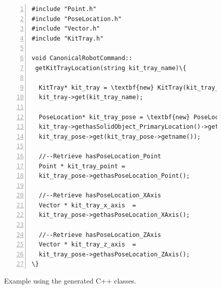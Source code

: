 \begin{figure}[t!h!]
\begin{minipage}{.5\paperwidth}
\begin{mylisting}
\begin{Verbatim}[commandchars=\\\{\},fontsize=\scriptsize, numbers=left, numbersep=2pt]
#include "Point.h"
#include "PoseLocation.h"
#include "Vector.h"
#include "KitTray.h"

void CanonicalRobotCommand::
 getKitTrayLocation(string kit_tray_name)\{

  KitTray* kit_tray = \textbf{new} KitTray(kit_tray_name);
  kit_tray->get(kit_tray_name);

  PoseLocation* kit_tray_pose = \textbf{new} PoseLocation(
  kit_tray->gethasSolidObject_PrimaryLocation()->getname());
  kit_tray_pose->get(kit_tray_pose->getname());

  //--Retrieve hasPoseLocation_Point
  Point * kit_tray_point =
  kit_tray_pose->gethasPoseLocation_Point();

  //--Retrieve hasPoseLocation_XAxis
  Vector * kit_tray_x_axis  =
  kit_tray_pose->gethasPoseLocation_XAxis();

  //--Retrieve hasPoseLocation_ZAxis
  Vector * kit_tray_z_axis  =
  kit_tray_pose->gethasPoseLocation_ZAxis();
\}
\end{Verbatim}
\end{mylisting}
\end{minipage}
\caption{Example using the generated C++ classes.}
\label{fig:exampleofuse}
\end{figure}


%
%
%
%
%
%

